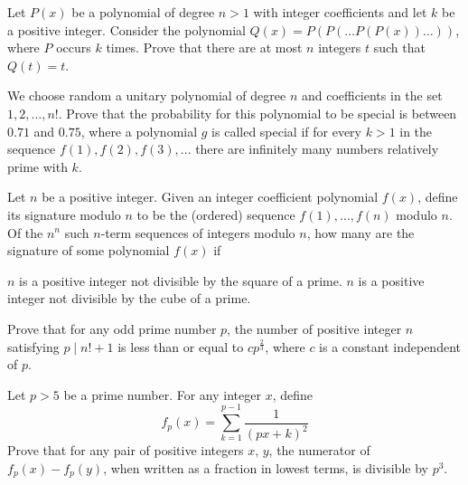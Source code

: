 \begin{question}[name={2006 IMO}]
    Let $P(x)$ be a polynomial of degree $n > 1$ with integer coefficients and let $k$ be a positive integer. Consider the polynomial $Q(x) = P(P(\ldots P(P(x)) \ldots ))$, where $P$ occurs $k$ times. Prove that there are at most $n$ integers $t$ such that $Q(t) = t$.
\end{question}

\begin{question}[name={2005 USA TST}]
    We choose random a unitary polynomial of degree $n$ and coefficients in the set $1,2,\dots,n!$. Prove that the probability for this polynomial to be special is between $0.71$ and $0.75$, where a polynomial $g$ is called special if for every $k>1$ in the sequence $f(1), f(2), f(3),\dots$ there are infinitely many numbers relatively prime with $k$.
\end{question}

\begin{question}[name={2008 USA TST}]
    Let $ n$ be a positive integer. Given an integer coefficient polynomial $ f(x)$, define its signature modulo $ n$ to be the (ordered) sequence $ f(1), \ldots , f(n)$ modulo $ n$. Of the $ n^n$ such $ n$-term sequences of integers modulo $ n$, how many are the signature of some polynomial $ f(x)$ if
    \begin{tasks}
        \task $ n$ is a positive integer not divisible by the square of a prime.
        \task $ n$ is a positive integer not divisible by the cube of a prime.
    \end{tasks}
\end{question}


\begin{question}[name={2009 China TST}]
    Prove that for any odd prime number $p$, the number of positive integer $n$ satisfying $ p\mid n! + 1$ is less than or equal to $ cp^\frac{2}{3}$, where $c$ is a constant independent of $p.$
\end{question}



\begin{question}[name={2002 USA TST}]
    Let $p>5$ be a prime number. For any integer $x$, define
    \[{f_p}(x) = \sum_{k=1}^{p-1} \frac{1}{(px+k)^2}\]
    Prove that for any pair of positive integers $x$, $y$, the numerator of $f_p(x) - f_p(y)$, when written as a fraction in lowest terms, is divisible by $p^3$.
\end{question}

